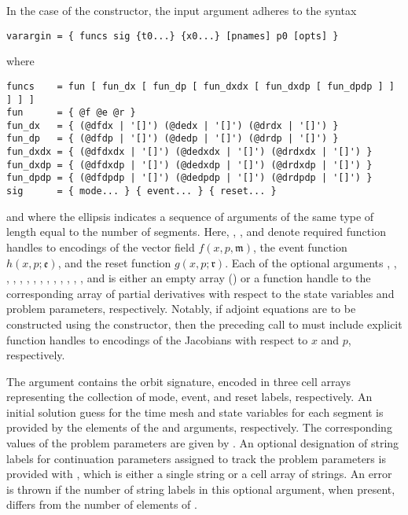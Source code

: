 In the case of the  constructor, the  input argument adheres to the syntax
\begin{lstlisting}[language=coco-highlight]
varargin = { funcs sig {t0...} {x0...} [pnames] p0 [opts] }
\end{lstlisting}
where
\begin{lstlisting}[language=coco-highlight]
funcs    = fun [ fun_dx [ fun_dp [ fun_dxdx [ fun_dxdp [ fun_dpdp ] ] ] ] ]
fun      = { @f @e @r }
fun_dx   = { (@dfdx | '[]') (@dedx | '[]') (@drdx | '[]') }
fun_dp   = { (@dfdp | '[]') (@dedp | '[]') (@drdp | '[]') }
fun_dxdx = { (@dfdxdx | '[]') (@dedxdx | '[]') (@drdxdx | '[]') }
fun_dxdp = { (@dfdxdp | '[]') (@dedxdp | '[]') (@drdxdp | '[]') }
fun_dpdp = { (@dfdpdp | '[]') (@dedpdp | '[]') (@drdpdp | '[]') }
sig      = { mode... } { event... } { reset... }
\end{lstlisting}
and where the ellipsis indicates a sequence of arguments of the same type of length equal to the number of segments. Here, , , and  denote required function handles to encodings of the vector field $f(x,p,\mathfrak{m})$, the event function $h(x,p;\mathfrak{e})$, and the reset function $g(x,p;\mathfrak{r})$. Each of the optional arguments , , , , , , , , , , , , , , and  is either an empty array (\mcode{[]}) or a function handle to the corresponding array of partial derivatives with respect to the state variables and problem parameters, respectively.  Notably, if adjoint equations are to be constructed using the  constructor, then the preceding call to  must include explicit function handles to encodings of the Jacobians with respect to $x$ and $p$, respectively. 

The  argument contains the orbit signature, encoded in three cell arrays representing the collection of mode, event, and reset labels, respectively. An initial solution guess for the time mesh and state variables for each segment is provided by the elements of the  and  arguments, respectively. The corresponding values of the problem parameters are given by . An optional designation of string labels for continuation parameters assigned to track the problem parameters is provided with , which is either a single string or a cell array of strings. An error is thrown if the number of string labels in this optional argument, when present, differs from the number of elements of . 

